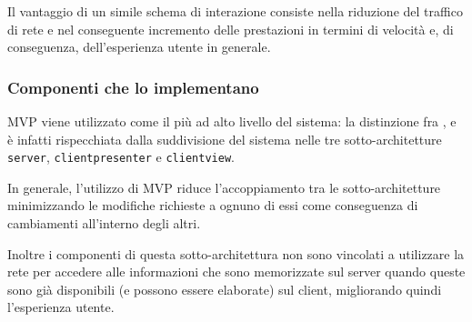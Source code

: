 Il vantaggio di un simile schema di interazione consiste nella riduzione del traffico di rete e nel conseguente incremento delle prestazioni in termini di velocità e, di conseguenza, dell'esperienza utente in generale.

\subsubsection{Componenti che lo implementano}
MVP viene utilizzato come il  più ad alto livello del sistema: la distinzione fra ,  e  è infatti rispecchiata dalla suddivisione del sistema nelle tre sotto-architetture \texttt{server}, \texttt{clientpresenter} e \texttt{clientview}.

In generale, l'utilizzo di MVP riduce l'accoppiamento tra le sotto-architetture minimizzando le modifiche richieste a ognuno di essi come conseguenza di cambiamenti all'interno degli altri.

Inoltre i componenti di questa sotto-architettura non sono vincolati a utilizzare la rete per accedere alle informazioni che sono memorizzate sul server quando queste sono già disponibili (e possono essere elaborate) sul client, migliorando quindi l'esperienza utente.

